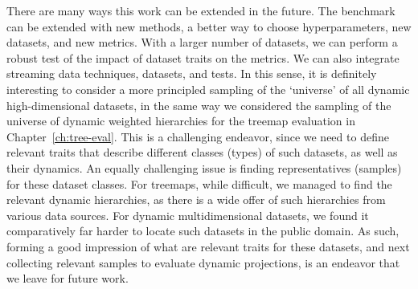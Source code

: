 There are many ways this work can be extended in the future.
The benchmark can be extended with new methods, a better way to choose hyperparameters, new datasets, and new metrics. With a larger number of datasets, we can perform a robust test of the impact of dataset traits on the metrics.
We can also integrate streaming data techniques, datasets, and tests. In this sense, it is definitely interesting to consider a more principled sampling of the `universe' of all dynamic high-dimensional datasets, in the same way we considered the sampling of the universe of dynamic weighted hierarchies for the treemap evaluation in Chapter~\ref{ch:tree-eval}. This is a challenging endeavor, since we need to define relevant traits that describe different classes (types) of such datasets, as well as their dynamics. An equally challenging issue is finding representatives (samples) for these dataset classes. For treemaps, while difficult, we managed to find the relevant dynamic hierarchies, as there is a wide offer of such hierarchies from various data sources. For dynamic multidimensional datasets, we found it comparatively far harder to locate such datasets in the public domain. As such, forming a good impression of what are relevant traits for these datasets, and next collecting relevant samples to evaluate dynamic projections, is an endeavor that we leave for future work.


    
